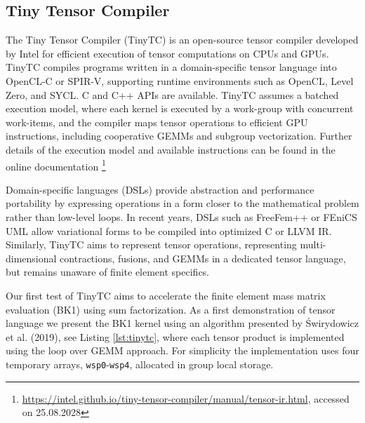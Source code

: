 \documentclass[a4paper,12pt]{article}
\begin{document}
\subsection{Tiny Tensor Compiler}

\label{sec:tinytc}

The Tiny Tensor Compiler (TinyTC) is an open-source tensor compiler developed by Intel for efficient execution of tensor computations on CPUs and GPUs. TinyTC compiles programs written in a domain-specific tensor language into OpenCL-C or SPIR-V, supporting runtime environments such as OpenCL, Level Zero, and SYCL. C and C++ APIs are available. TinyTC assumes a batched execution model, where each kernel is executed by a work-group with concurrent work-items, and the compiler maps tensor operations to efficient GPU instructions, including cooperative GEMMs and subgroup vectorization. Further details of the execution model and available instructions can be found in the online documentation \footnote{\url{https://intel.github.io/tiny-tensor-compiler/manual/tensor-ir.html}, accessed on 25.08.2028}

Domain-specific languages (DSLs) provide abstraction and performance portability by expressing operations in a form closer to the mathematical problem rather than low-level loops. In recent years, DSLs such as FreeFem++ or FEniCS UML allow variational forms to be compiled into optimized C or LLVM IR. Similarly, TinyTC aims to represent tensor operations, representing multi-dimensional contractions, fusions, and GEMMs in a dedicated tensor language, but remains unaware of finite element specifics.

Our first test of TinyTC aims to accelerate the finite element mass matrix evaluation (BK1) using sum factorization. As a first demonstration of tensor language we present the BK1 kernel using an algorithm presented by Świrydowicz et al. (2019), see Listing \ref{lst:tinytc}, where each tensor product is implemented using the loop over GEMM approach. For simplicity the implementation uses four temporary arrays, \texttt{wsp0}-\texttt{wsp4}, allocated in group local storage.
\end{document}
